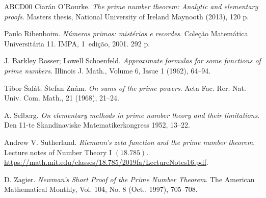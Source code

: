 \documentclass[11pt]{amsart}
\numberwithin{equation}{section}
\begin{document}
\begin{thebibliography}{ABCD00}
 Ciar\'an O'Rourke. {\em The prime number theorem: Analytic and elementary proofs}.  Masters thesis, National University of Ireland Maynooth (2013), 120 p.

 Paulo Ribenboim. {\em N\'umeros primos: mist\'erios e recordes}. Cole\c{c}\~ao Matem\'atica Universit\'aria 11. IMPA, 1\textordfeminine \ edi\c{c}\~ao, 2001. 292 p.

 J. Barkley Rosser; Lowell Schoenfeld. {\em Approximate formulas for some functions of prime numbers}. Illinois J. Math., Volume 6, Issue 1 (1962), 64--94.

 Tibor \v{S}al\'at; \v{S}tefan Zn\'am. {\em On sums of the prime powers}. Acta Fac. Rer. Nat. Univ. Com. Math., 21 (1968), 21--24.

 A. Selberg. {\em On elementary methods in prime number theory and their limitations}. Den 11-te Skandinaviske Matematikerkongress 1952, 13--22.

 Andrew V. Sutherland. {\em Riemann's zeta function and the prime number theorem}. Lecture notes of Number Theory I $(18.785)$. \url{https://math.mit.edu/classes/18.785/2019fa/LectureNotes16.pdf}.

 D. Zagier. {\em Newman's Short Proof of the Prime Number Theorem}. The American Mathematical Monthly, Vol. 104, No. 8 (Oct., 1997), 705--708.

\end{thebibliography}
\end{document}
